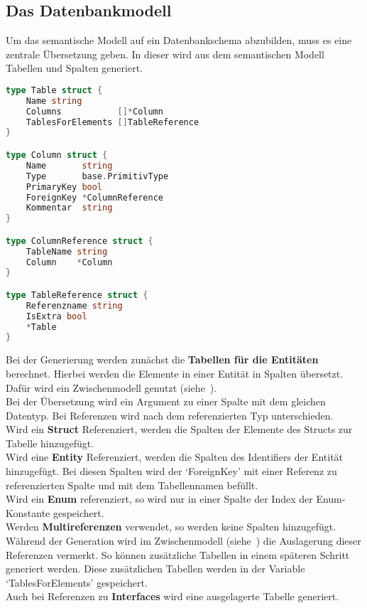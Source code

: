 \documentclass[./einleitung.tex]{subfiles}
\begin{document}
    \subsection{Das Datenbankmodell}\label{subsec:das-datenbankmodell}
    Um das semantische Modell auf ein Datenbankschema abzubilden, muss es eine zentrale Übersetzung geben.
    In dieser wird aus dem semantischen Modell Tabellen und Spalten generiert.
    \begin{lstlisting}[language=Go, captio=Datenstruktur für Tabellen und Spalten, label=lst:tableColumn]
type Table struct {
	Name string
	Columns           []*Column
	TablesForElements []TableReference
}

type Column struct {
	Name       string
	Type       base.PrimitivType
	PrimaryKey bool
	ForeignKey *ColumnReference
	Kommentar  string
}

type ColumnReference struct {
	TableName string
	Column    *Column
}

type TableReference struct {
	Referenzname string
	IsExtra bool
	*Table
}
    \end{lstlisting}
    Bei der Generierung werden zunächst die \textbf{Tabellen für die Entitäten} berechnet.
    Hierbei werden die Elemente in einer Entität in Spalten übersetzt.
    Dafür wird ein Zwischenmodell genutzt (siehe~).\\
    Bei der Übersetzung wird ein Argument zu einer Spalte mit dem gleichen Datentyp.
    Bei Referenzen wird nach dem referenzierten Typ unterschieden.\\
    Wird ein \textbf{Struct} Referenziert, werden die Spalten der Elemente des Structs zur Tabelle hinzugefügt.\\
    Wird eine \textbf{Entity} Referenziert, werden die Spalten des Identifiers der Entität hinzugefügt.
    Bei diesen Spalten wird der `ForeignKey' mit einer Referenz zu referenzierten Spalte und mit dem Tabellennamen befüllt.\\
    Wird ein \textbf{Enum} referenziert, so wird nur in einer Spalte der Index der Enum-Konstante gespeichert.\\
    Werden \textbf{Multireferenzen} verwendet, so werden keine Spalten hinzugefügt.
    Während der Generation wird im Zwischenmodell (siehe~) die Auslagerung dieser Referenzen vermerkt.
    So können zusätzliche Tabellen in einem späteren Schritt generiert werden.
    Diese zusätzlichen Tabellen werden in der Variable `TablesForElements' gespeichert.\\
    Auch bei Referenzen zu \textbf{Interfaces} wird eine ausgelagerte Tabelle generiert.
\end{document}

